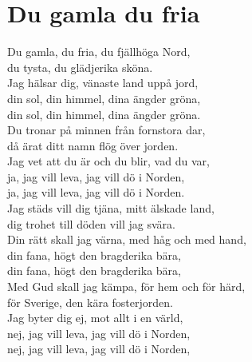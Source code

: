 \section{Du gamla du fria}
Du gamla, du fria, du fjällhöga Nord,\\
du tysta, du glädjerika sköna.\\
Jag hälsar dig, vänaste land uppå jord,\\
din sol, din himmel, dina ängder gröna,\\
din sol, din himmel, dina ängder gröna.\\

Du tronar på minnen från fornstora dar,\\
då ärat ditt namn flög över jorden.\\
Jag vet att du är och du blir, vad du var,\\
ja, jag vill leva, jag vill dö i Norden,\\
ja, jag vill leva, jag vill dö i Norden.\\

Jag städs vill dig tjäna, mitt älskade land,\\
dig trohet till döden vill jag svära.\\
Din rätt skall jag värna, med håg och med hand,\\
din fana, högt den bragderika bära,\\
din fana, högt den bragderika bära,\\

Med Gud skall jag kämpa, för hem och för härd,\\
för Sverige, den kära fosterjorden.\\
Jag byter dig ej, mot allt i en värld,\\
nej, jag vill leva, jag vill dö i Norden,\\
nej, jag vill leva, jag vill dö i Norden,\\